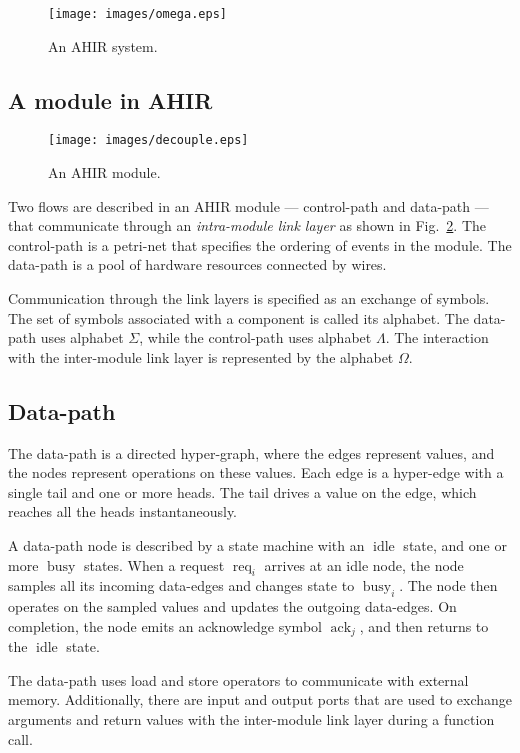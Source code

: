 \documentclass[conference]{IEEEtran}
\newcommand{\sym}[1]{$\operatorname{#1}$}
\begin{document}
\begin{figure}[!t]
  \centering
  \texttt{[image: images/omega.eps]}
  \caption{An AHIR system.}
  \label{fig:system}
\end{figure}

\subsection{A module in AHIR}


\begin{figure}[!t]
  \centering
  \texttt{[image: images/decouple.eps]}
  \caption{An AHIR module.}
  \label{fig:decouple}
\end{figure}

Two flows are described in an AHIR module --- control-path and
data-path --- that communicate through an \emph{intra-module link
  layer} as shown in Fig.~\ref{fig:decouple}. The control-path is a
petri-net that specifies the ordering of events in the module. The
data-path is a pool of hardware resources connected by wires.

Communication through the link layers is specified as an exchange of
symbols. The set of symbols associated with a component is called its
alphabet. The data-path uses alphabet $\Sigma$, while the control-path
uses alphabet $\Lambda$. The interaction with the inter-module link
layer is represented by the alphabet $\Omega$.

\subsection{Data-path}

The data-path is a directed hyper-graph, where the edges represent
values, and the nodes represent operations on these values. Each edge
is a hyper-edge with a single tail and one or more heads. The tail
drives a value on the edge, which reaches all the heads
instantaneously.

A data-path node is described by a state machine with an \sym{idle}
state, and one or more \sym{busy} states. When a request
$\operatorname{req}_i$ arrives at an idle node, the node samples all
its incoming data-edges and changes state to $\operatorname{busy}_i$.
The node then operates on the sampled values and updates the outgoing
data-edges. On completion, the node emits an acknowledge symbol
$\operatorname{ack}_j$, and then returns to the \sym{idle} state.

The data-path uses load and store operators to communicate with
external memory. Additionally, there are input and output ports that
are used to exchange arguments and return values with the inter-module
link layer during a function call.
\end{document}
